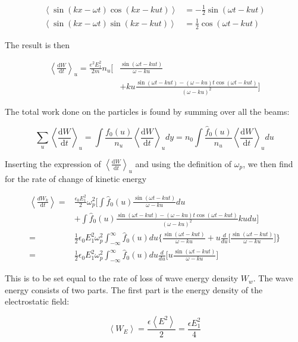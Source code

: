\documentclass[
  notoc %
]{tufte-book}
\begin{document}
\[
\begin{aligned}
\left< \sin(kx-\omega t)\cos(kx-kut) \right> &= -\frac{1}{2}\sin(\omega t-kut) \\
\left< \sin(kx-\omega t)\sin(kx-kut) \right> &= \frac{1}{2}\cos(\omega t-kut)
\end{aligned}
\]

The result is then

\[
\begin{aligned}
\left< \frac{\mathrm{d}W}{\mathrm{d}t}\right>_u = \frac{e^2E_1^2}{2m}n_u\Big[ &\frac{\sin(\omega t - kut)}{\omega - ku} \\
& + ku\frac{\sin(\omega t-kut) - (\omega-ku)t\cos(\omega t-kut)}{(\omega-ku)^2} \Big]
\end{aligned}
\]

The total work done on the particles is found by summing over all the
beams:

\[
\sum_u \left< \frac{\mathrm{d}W}{\mathrm{d}t}\right>_u = \int \frac{f_0(u)}{n_u}\left< \frac{\mathrm{d}W}{\mathrm{d}t}\right>_u dy = n_0\int\frac{\hat{f}_0(u)}{n_u}\left< \frac{\mathrm{d}W}{\mathrm{d}t}\right>_u du
\]

Inserting the expression of
\(\left< \frac{\mathrm{d}W}{\mathrm{d}t}\right>_u\) and using the
definition of \(\omega_p\), we then find for the rate of change of
kinetic energy

\[
\begin{aligned}
\left< \frac{dW_k}{\mathrm{d}t}\right> =& \frac{\epsilon_0 E_1^2}{2}\omega_p^2 \Big[ \int\hat{f}_0(u)\frac{\sin(\omega t - kut)}{\omega - ku} du \\
& + \int\hat{f}_0(u) \frac{\sin(\omega t-kut) - (\omega-ku)t\cos(\omega t-kut)}{(\omega-ku)^2}ku du \Big] \\
=& \frac{1}{2}\epsilon_0 E_1^2 \omega_p^2 \int_{-\infty}^{\infty}\hat{f}_0(u) du \Big\{ \frac{\sin(\omega t - kut)}{\omega - ku} + u\frac{d}{du}\Big[\frac{\sin(\omega t - kut)}{\omega - ku} \Big] \Big\} \\
=& \frac{1}{2}\epsilon_0 E_1^2 \omega_p^2 \int_{-\infty}^{\infty}\hat{f}_0(u) du \frac{d}{du}\Big[u\frac{\sin(\omega t - kut)}{\omega - ku} \Big]
\end{aligned}
\]

This is to be set equal to the rate of loss of wave energy density
\(W_w\). The wave energy consists of two parts. The first part is the
energy density of the electrostatic field:

\[
\left< W_E \right> = \frac{\epsilon \left< E^2 \right>}{2} = \frac{\epsilon E_1^2}{4}
\]
\end{document}
